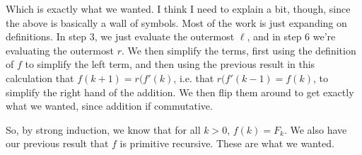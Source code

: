\documentclass{article}
\begin{document}
Which is exactly what we wanted. I think I need to explain a bit,
though, since the above is basically a wall of symbols. Most of the
work is just expanding on definitions. In step 3, we just evaluate the
outermost $\ell$, and in step 6 we're evaluating the outermost $r$. We
then simplify the terms, first using the definition of $f$ to simplify
the left term, and then using the previous result in this calculation
that $f(k+1) = r(f'(k)$, i.e. that $r(f'(k-1) = f(k)$, to simplify the
right hand of the addition. We then flip them around to get exactly
what we wanted, since addition if commutative.

So, by strong induction, we know that for all $k > 0$, $f(k) = F_k$.
We also have our previous result that $f$ is primitive
recursive. These are what we wanted.
\end{document}
